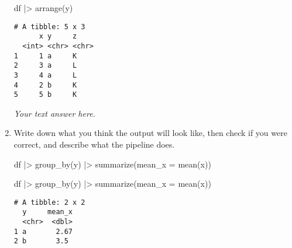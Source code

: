 \documentclass[
  letterpaper,
  DIV=11,
  numbers=noendperiod]{scrreprt}
\newenvironment{Shaded}{\begin{snugshade}}{\end{snugshade}}
\newcommand{\AttributeTok}[1]{\textcolor[rgb]{0.40,0.45,0.13}{#1}}
\newcommand{\FunctionTok}[1]{\textcolor[rgb]{0.28,0.35,0.67}{#1}}
\newcommand{\NormalTok}[1]{\textcolor[rgb]{0.00,0.23,0.31}{#1}}
\newcommand{\SpecialCharTok}[1]{\textcolor[rgb]{0.37,0.37,0.37}{#1}}
\begin{document}
\begin{enumerate}
\begin{tcolorbox}
\begin{Shaded}
\begin{Highlighting}[]
\NormalTok{df }\SpecialCharTok{|\textgreater{}}
  \FunctionTok{arrange}\NormalTok{(y)}
\end{Highlighting}
\end{Shaded}

\begin{verbatim}
# A tibble: 5 x 3
      x y     z    
  <int> <chr> <chr>
1     1 a     K    
2     3 a     L    
3     4 a     L    
4     2 b     K    
5     5 b     K    
\end{verbatim}

  \emph{Your text answer here.}

  \end{tcolorbox}
\item
  Write down what you think the output will look like, then check if you
  were correct, and describe what the pipeline does.

\begin{Shaded}
\begin{Highlighting}[]
\NormalTok{df }\SpecialCharTok{|\textgreater{}}
  \FunctionTok{group\_by}\NormalTok{(y) }\SpecialCharTok{|\textgreater{}}
  \FunctionTok{summarize}\NormalTok{(}\AttributeTok{mean\_x =} \FunctionTok{mean}\NormalTok{(x))}
\end{Highlighting}
\end{Shaded}

  \begin{tcolorbox}[enhanced jigsaw, breakable, bottomtitle=1mm, left=2mm, colback=white, toprule=.15mm, leftrule=.75mm, colframe=quarto-callout-note-color-frame, colbacktitle=quarto-callout-note-color!10!white, title={Answer}, coltitle=black, toptitle=1mm, bottomrule=.15mm, opacitybacktitle=0.6, arc=.35mm, rightrule=.15mm, titlerule=0mm, opacityback=0]

\begin{Shaded}
\begin{Highlighting}[]
\NormalTok{df }\SpecialCharTok{|\textgreater{}}
  \FunctionTok{group\_by}\NormalTok{(y) }\SpecialCharTok{|\textgreater{}}
  \FunctionTok{summarize}\NormalTok{(}\AttributeTok{mean\_x =} \FunctionTok{mean}\NormalTok{(x))}
\end{Highlighting}
\end{Shaded}

\begin{verbatim}
# A tibble: 2 x 2
  y     mean_x
  <chr>  <dbl>
1 a       2.67
2 b       3.5 
\end{verbatim}


\end{tcolorbox}
\end{enumerate}
\end{document}

